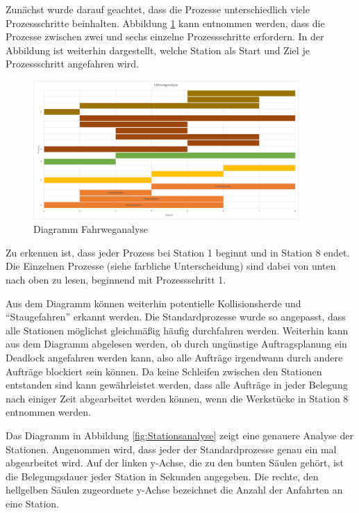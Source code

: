 Zunächst wurde darauf geachtet, dass die Prozesse unterschiedlich viele Prozessschritte beinhalten. Abbildung \ref{fig:Fahrweganalyse} kann entnommen werden, dass die Prozesse zwischen zwei und sechs einzelne Prozessschritte erfordern. In der Abbildung ist weiterhin dargestellt, welche Station als Start und Ziel je Prozessschritt angefahren wird. 

\begin{figure}[htb]
    \centering
    \includegraphics[width=0.9\textwidth]{Abbildungen/Fahrweganalyse.PNG}
    \caption{Diagramm Fahrweganalyse}		
    \label{fig:Fahrweganalyse}
\end{figure}

Zu erkennen ist, dass jeder Prozess bei Station 1 beginnt und in Station 8 endet. Die Einzelnen Prozesse (siehe farbliche Unterscheidung) sind dabei von unten nach oben zu lesen, beginnend mit Prozessschritt 1. 

Aus dem Diagramm können weiterhin potentielle Kollisionsherde und "`Staugefahren"' erkannt werden. Die Standardprozesse wurde so angepasst, dass alle Stationen möglichst gleichmäßig häufig durchfahren werden. Weiterhin kann aus dem Diagramm abgelesen werden, ob durch ungünstige Auftragsplanung ein Deadlock angefahren werden kann, also alle Aufträge irgendwann durch andere Aufträge blockiert sein können. Da keine Schleifen zwischen den Stationen entstanden sind kann gewährleistet werden, dass alle Aufträge in jeder Belegung nach einiger Zeit abgearbeitet werden können, wenn die Werkstücke in Station 8 entnommen werden.

Das Diagramm in Abbildung \ref{fig:Stationsanalyse} zeigt eine genauere Analyse der Stationen. Angenommen wird, dass jeder der Standardprozesse genau ein mal abgearbeitet wird. Auf der linken y-Achse, die zu den bunten Säulen gehört, ist die Belegungsdauer jeder Station in Sekunden angegeben. Die rechte, den hellgelben Säulen zugeordnete y-Achse bezeichnet die Anzahl der Anfahrten an eine Station. 


